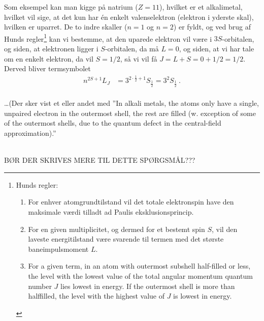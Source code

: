 Som eksempel kan man kigge på natrium ($Z=11$), hvilket er et alkalimetal, hvilket vil sige, at det kun har én enkelt valenselektron (elektron i yderste skal), hvilken er uparret. De to indre skaller ($n=1$ og $n=2$) er fyldt, og ved brug af Hunds regler\footnote{Hunds regler:
\begin{enumerate}
    \item For enhver atomgrundtilstand vil det totale elektronspin have den maksimale værdi tilladt ad Paulis eksklusionsprincip.
    \item For en given multiplicitet, og dermed for et bestemt spin $S$, vil den laveste energitilstand være svarende til termen med det største baneimpulsmoment $L$.
    \item For a given term, in an atom with outermost subshell half-filled or less, the level with the lowest value of the total angular momentum quantum number $J$ lies lowest in energy. If the outermost shell is more than halffilled, the level with the highest value of $J$ is lowest in energy.
\end{enumerate}
} kan vi bestemme, at den uparede elektron vil være i $3S$-orbitalen, og siden, at elektronen ligger i $S$-orbitalen, da må $L = 0$, og siden, at vi har tale om en enkelt elektron, da vil $S = 1/2$, så vi vil få $J = L + S = 0 + 1/2 = 1/2$. Derved bliver termsymbolet
\begin{align}
    n^{2S+1}L_J &= 3^{2 \cdot \frac{1}{2} + 1}S_\frac{1}{2} = 3^2S_\frac{1}{2} \: .
\end{align}
$ $\\\\

\ldots (Der sker vist et eller andet med ''In alkali metals, the atoms only have a single, unpaired electron in the outermost shell, the rest are filled (w.
exception of some of the outermost shells, due to the quantum defect in the central-field approximation).''



$ $\\\\
BØR DER SKRIVES MERE TIL DETTE SPØRGSMÅL???
